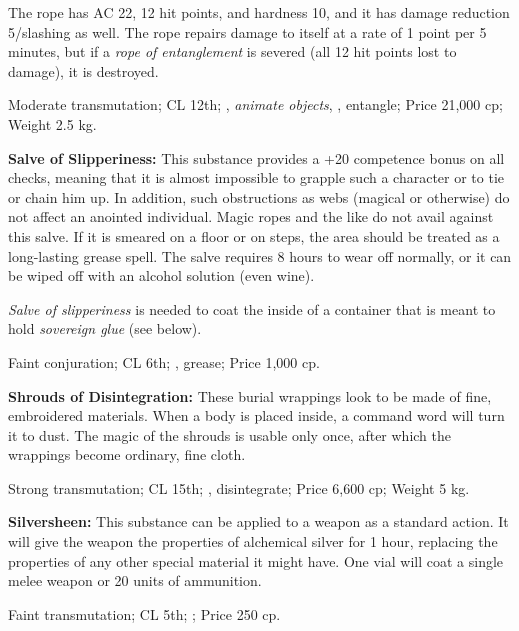 The rope has AC 22, 12 hit points, and hardness 10, and it has damage reduction 5/slashing as well. The rope repairs damage to itself at a rate of 1 point per 5 minutes, but if a \emph{rope of entanglement} is severed (all 12 hit points lost to damage), it is destroyed.

Moderate transmutation; CL 12th; , \emph{animate objects}, , entangle; Price 21,000 cp; Weight 2.5 kg.



\textbf{Salve of Slipperiness:} This substance provides a +20 competence bonus on all  checks, meaning that it is almost impossible to grapple such a character or to tie or chain him up. In addition, such obstructions as webs (magical or otherwise) do not affect an anointed individual. Magic ropes and the like do not avail against this salve. If it is smeared on a floor or on steps, the area should be treated as a long-lasting grease spell. The salve requires 8 hours to wear off normally, or it can be wiped off with an alcohol solution (even wine).

\emph{Salve of slipperiness} is needed to coat the inside of a container that is meant to hold \emph{sovereign glue} (see below).

Faint conjuration; CL 6th; , grease; Price 1,000 cp.



\textbf{Shrouds of Disintegration:} These burial wrappings look to be made of fine, embroidered materials. When a body is placed inside, a command word will turn it to dust. The magic of the shrouds is usable only once, after which the wrappings become ordinary, fine cloth.

Strong transmutation; CL 15th; , disintegrate; Price 6,600 cp; Weight 5 kg.



\textbf{Silversheen:} This substance can be applied to a weapon as a standard action. It will give the weapon the properties of alchemical silver for 1 hour, replacing the properties of any other special material it might have. One vial will coat a single melee weapon or 20 units of ammunition.

Faint transmutation; CL 5th; ; Price 250 cp.



